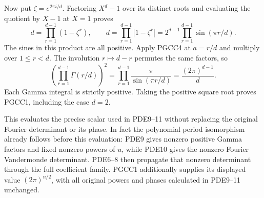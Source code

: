 Now put $\zeta=e^{2\pi i/d}$. Factoring $X^d-1$ over its distinct
roots and evaluating the quotient by $X-1$ at $X=1$ proves
\[
 d=\prod_{r=1}^{d-1}(1-\zeta^r),\qquad
 d=\prod_{r=1}^{d-1}|1-\zeta^r|
   =2^{d-1}\prod_{r=1}^{d-1}\sin(\pi r/d).
 \tag{PGCC5}
\]
The sines in this product are all positive. Apply PGCC4 at
$a=r/d$ and multiply over $1\leq r<d$. The involution
$r\mapsto d-r$ permutes the same factors, so
\[
 \left(\prod_{r=1}^{d-1}\Gamma(r/d)\right)^2
 =\prod_{r=1}^{d-1}\frac{\pi}{\sin(\pi r/d)}
 =\frac{(2\pi)^{d-1}}d.
 \tag{PGCC6}
\]
Each Gamma integral is strictly positive. Taking the positive square
root proves PGCC1, including the case $d=2$.

This evaluates the precise scalar used in PDE9--11 without replacing
the original Fourier determinant or its phase. In fact the polynomial
period isomorphism already follows before this evaluation: PDE9 gives
nonzero positive Gamma factors and fixed nonzero powers of $u$, while
PDE10 gives the nonzero Fourier Vandermonde determinant. PDE6--8 then
propagate that nonzero determinant through the full coefficient family.
PGCC1 additionally supplies its displayed value $(2\pi)^{n/2}$,
with all original powers and phases calculated in PDE9--11 unchanged.
